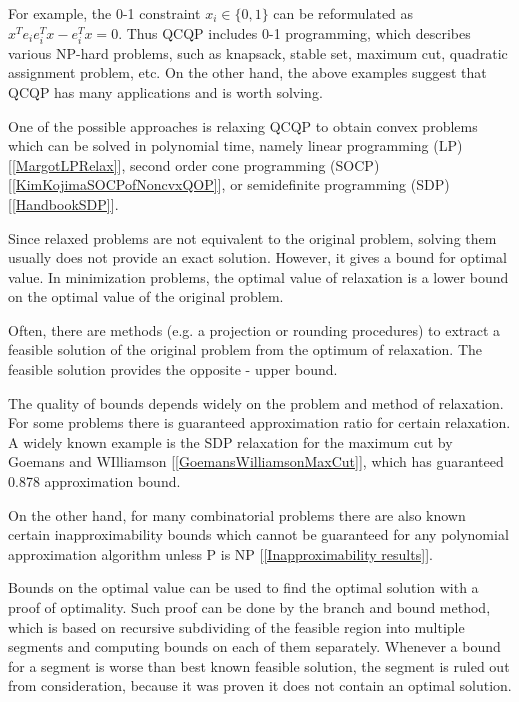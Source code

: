 \documentclass[12pt]{book}
\theoremstyle{definition}
\begin{document}
For example, the 0-1 constraint $x_i\in \{0,1\}$ can be reformulated as $x^Te_ie_i^Tx - e_i^Tx =0$. Thus QCQP includes 0-1 programming, which describes various NP-hard problems, such as knapsack, stable set, maximum cut, quadratic assignment problem,  etc. 
On the other hand, the above examples suggest that QCQP has many applications and is worth solving.

One of the possible approaches is relaxing QCQP to obtain convex problems which can be solved in polynomial time, namely linear programming (LP) [\ref{MargotLPRelax}], second order cone programming  (SOCP) [\ref{KimKojimaSOCPofNoncvxQOP}], or semidefinite programming (SDP) [\ref{HandbookSDP}].


Since relaxed problems are not equivalent to the original problem, solving them usually does not provide an exact solution. However, it gives a bound for optimal value. In minimization problems, the optimal value of relaxation is a lower bound on the optimal value of the original problem. 

Often, there are methods (e.g. a projection or rounding procedures) to extract a feasible solution of the original problem from the optimum of relaxation. The feasible solution provides the opposite - upper bound.


The quality of bounds depends widely on the problem and method of relaxation. For some problems there is guaranteed approximation ratio for certain relaxation. A widely known example is the SDP relaxation for the maximum cut by Goemans and WIlliamson [\ref{GoemansWilliamsonMaxCut}], which has guaranteed 0.878 approximation bound.

On the other hand, for many combinatorial problems there are also known certain inapproximability bounds which cannot be guaranteed for any polynomial approximation algorithm unless P is NP [\ref{Inapproximability results}]. 


Bounds on the optimal value can be used to find the optimal solution with a proof of optimality. Such proof can be done by the branch and bound method, which is based on recursive subdividing of the feasible region into multiple segments and computing bounds on each of them separately. Whenever a bound for a segment is worse than best known feasible solution, the segment is ruled out from consideration, because it was proven it does not contain an optimal solution. 
\end{document}

